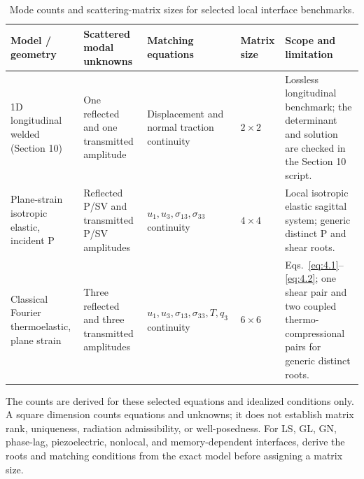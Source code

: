 \begin{table}[htbp]
\centering
\scriptsize
\setlength{\tabcolsep}{2.5pt}
\renewcommand{\arraystretch}{1.1}
\caption{Mode counts and scattering-matrix sizes for selected local interface benchmarks.}
\label{tab:T6-mode-counts}
\begin{tabularx}{\textwidth}{@{}p{2.7cm}p{2.45cm}p{3.15cm}p{1.45cm}X@{}}
\toprule
\textbf{Model / geometry} & \textbf{Scattered modal unknowns} & \textbf{Matching equations} & \textbf{Matrix size} & \textbf{Scope and limitation} \\
\midrule
1D longitudinal welded (Section 10) & One reflected and one transmitted amplitude & Displacement and normal traction continuity & $2\times2$ & Lossless longitudinal benchmark; the determinant and solution are checked in the Section 10 script. \\
Plane-strain isotropic elastic, incident P & Reflected P/SV and transmitted P/SV amplitudes & $u_1,u_3,\sigma_{13},\sigma_{33}$ continuity & $4\times4$ & Local isotropic elastic sagittal system; generic distinct P and shear roots. \\
Classical Fourier thermoelastic, plane strain & Three reflected and three transmitted amplitudes & $u_1,u_3,\sigma_{13},\sigma_{33},T,q_3$ continuity & $6\times6$ & Eqs.~\eqref{eq:4.1}--\eqref{eq:4.2}; one shear pair and two coupled thermo-compressional pairs for generic distinct roots. \\
\bottomrule
\end{tabularx}
\end{table}

\noindent\footnotesize{The counts are derived for these selected equations and idealized conditions only. A square dimension counts equations and unknowns; it does not establish matrix rank, uniqueness, radiation admissibility, or well-posedness. For LS, GL, GN, phase-lag, piezoelectric, nonlocal, and memory-dependent interfaces, derive the roots and matching conditions from the exact model before assigning a matrix size.}
